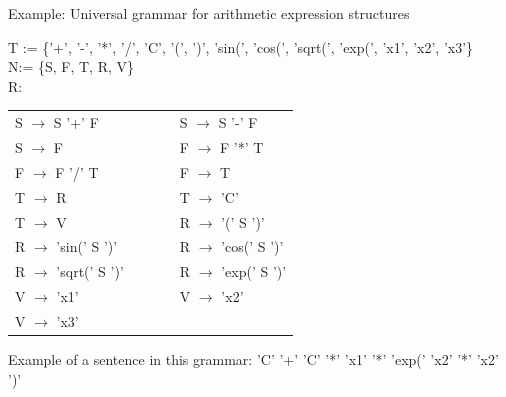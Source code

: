 \documentclass[t,usenames,dvipsnames]{beamer} %
\newcommand{\1}{\boldsymbol{1}}
\newcommand{\0}{\boldsymbol{0}}
\begin{document}
\begin{frame}[plain]
\begin{block}{Example: Universal grammar for arithmetic expression structures}

T := \{'+', '-', '*', '/', 'C', '(', ')', 'sin(', 'cos(', 'sqrt(', 'exp(', 'x1', 'x2', 'x3'\} \\
N:= \{S, F, T, R, V\} \\

R: \\
\begin{tabular}{lllll}
S $\to$ S '+' F &&&&
S $\to$ S '-' F \\
S $\to$ F &&&&
F $\to$ F '*' T \\
F $\to$ F '/' T &&&&
F $\to$ T \\
T $\to$ R &&&&
T $\to$ 'C' \\
T $\to$ V &&&&
R $\to$ '(' S ')' \\
R $\to$ 'sin(' S ')' &&&&
R $\to$ 'cos(' S ')' \\
R $\to$ 'sqrt(' S ')' &&&&
R $\to$ 'exp(' S ')'  \\
V $\to$ 'x1' &&&&
V $\to$ 'x2' \\
V $\to$ 'x3'
\end{tabular}
\end{block}

\begin{block}{Example of a sentence in this grammar:}
'C' '+' 'C' '*' 'x1' '*' 'exp(' 'x2' '*' 'x2' ')'
\end{block}

\end{frame}
\end{document}
